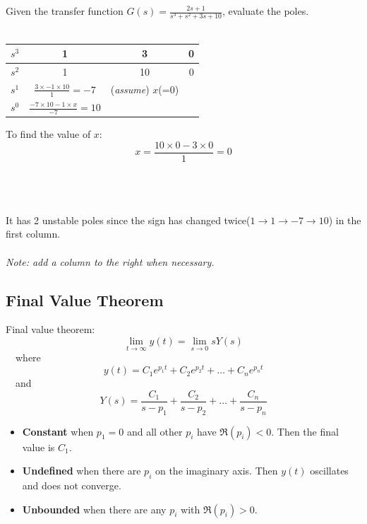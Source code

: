 \begin{ex}{}
Given the transfer function $\displaystyle G(s) = \frac{2s+1}{s^{3}+s^{2}+3s+10}$, evaluate the poles.\\\\
\begin{minipage}{0.5\textwidth}
    \begin{table}[H]
        \begin{tabular}{c|c|c|c}
            $s^{3}$&1&3&0\\ \hline
            $s^{2}$&1&10&0\\ \hline \hline
            $s^{1}$&$\frac{3\times -1\times 10}{1}=-7$&(\textit{assume}) $x$(=0)& \\ \hline 
            $s^{0}$&$\frac{-7\times 10 -1\times x}{-7}=10$&&\\ 
        \end{tabular}
    \end{table}
 \end{minipage} \hfill
 \begin{minipage}{0.4\textwidth}
    To find the value of $x$:
    \[x = \frac{10\times0-3\times0}{1}=0\]
 \end{minipage}\\\\\\
  It has 2 unstable poles since the sign has changed twice($1\to 1\to -7 \to 10$) in the first column.
  \ \\ \\
 \textit{Note: add a column to the right when necessary.}
\end{ex}


\subsection{Final Value Theorem}
Final value theorem:
\[\lim_{t\to \infty}y(t) = \lim_{s\to 0}sY(s)\]
\ \ where 
\[y(t) = C_{1}e^{p_{1}t} +  C_{2}e^{p_{2}t}+ \ldots +  C_{n}e^{p_{n}t}\]
\ \ and 
\[Y(s) = \frac{C_{1}}{s-p_{1}}+\frac{C_{2}}{s-p_{2}}+\ldots+\frac{C_{n}}{s-p_{n}}\]

\begin{itemize}
    \item \textbf{Constant} when $p_{1}=0$ and all other $p_{i}$ have $\Re (p_{i})<0$. Then the final value is $C_{1}$.
    
    \item \textbf{Undefined} when there are $p_{i}$ on the imaginary axis. Then $y(t)$ oscillates and does not converge.
    
    \item \textbf{Unbounded} when there are any $p_{i}$ with $\Re (p_{i})>0$.
\end{itemize}

